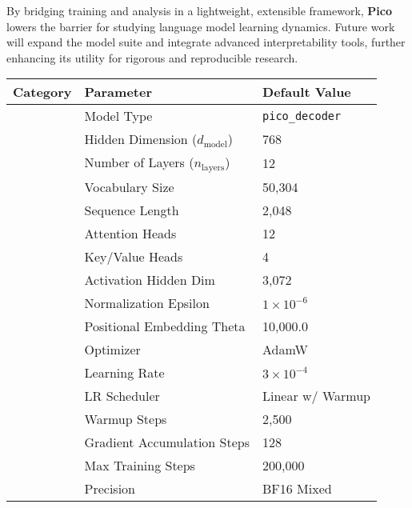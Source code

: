 By bridging training and analysis in a lightweight, extensible framework, \textbf{Pico} lowers the barrier for studying language model learning dynamics. Future work will expand the model suite and integrate advanced interpretability tools, further enhancing its utility for rigorous and reproducible research.


\begin{table*}[h!]
    \centering
    \renewcommand{\arraystretch}{1} %
    \setlength{\tabcolsep}{8pt} %
    \begin{tabular}{|>{\centering\arraybackslash}p{3cm}|p{5cm}|p{6.5cm}|}
        \hline
        \textbf{Category} & \textbf{Parameter} & \textbf{Default Value} \\
        \hline
        \multirow{10}{*}{\textbf{Model}}  
            & Model Type & \texttt{pico\_decoder} \\
            & Hidden Dimension ($d_{\text{model}}$) & 768 \\
            & Number of Layers ($n_{\text{layers}}$) & 12 \\
            & Vocabulary Size & 50,304 \\
            & Sequence Length & 2,048 \\
            & Attention Heads & 12 \\
            & Key/Value Heads & 4 \\
            & Activation Hidden Dim & 3,072 \\
            & Normalization Epsilon & $1 \times 10^{-6}$ \\
            & Positional Embedding Theta & 10,000.0 \\
        \hline
        \multirow{7}{*}{\textbf{Training}}  
            & Optimizer & AdamW \\
            & Learning Rate & $3 \times 10^{-4}$ \\
            & LR Scheduler & Linear w/ Warmup \\
            & Warmup Steps & 2,500 \\
            & Gradient Accumulation Steps & 128 \\
            & Max Training Steps & 200,000 \\
            & Precision & BF16 Mixed \\

\end{tabular}
\end{table*}
